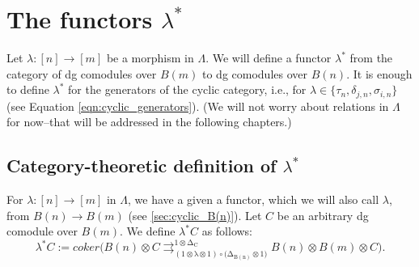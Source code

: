 
\section{The functors $\lambda^*$}
Let $\lambda:[n] \to [m]$ be a morphism in $\Lambda$. 
We will define a functor $\lambda^*$ from the category of 
dg comodules over $B(m)$ to dg comodules over $B(n)$. 
It is enough to define $\lambda^*$ for the generators of 
the cyclic category, i.e., for $\lambda \in \{
\tau_n, \delta_{j,n}, \sigma_{i,n}\}$ (see Equation 
\ref{eqn:cyclic_generators}). (We will not worry about 
relations in $\Lambda$ for now--that will be addressed 
in the following chapters.)

\subsection{Category-theoretic definition of $\lambda^*$}
For $\lambda:[n] \to [m]$ in $\Lambda$, we have a given a 
functor, which we will also call $\lambda$, from 
$B(n) \to B(m)$ (see \ref{sec:cyclic_B(n)}). Let $C$ be an 
arbitrary dg comodule over $B(m)$. We define 
$\lambda^* C$ as follows:
$$
\lambda^*C := 
coker \big( B(n)\otimes C 
\mathrel{\mathop{\rightrightarrows}^
{\mathrm{1\otimes \Delta_{C}}}_
{\mathrm{(1\otimes \lambda \otimes 1)\circ (\Delta_{B(n)}\otimes 1})}}
B(n) \otimes B(m)\otimes C \big).
$$

